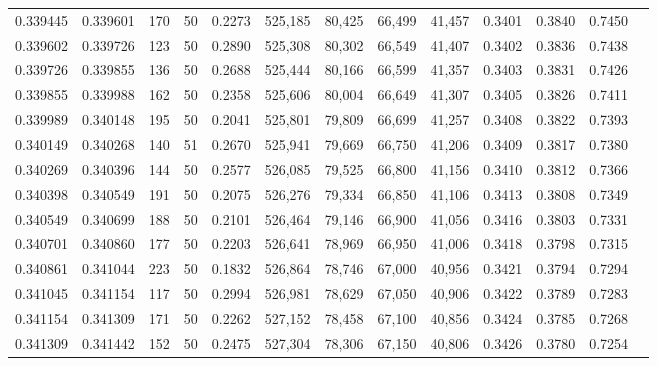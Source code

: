 \begin{tabular}{rrrrrrrrrrrrr}
0.339445 & 0.339601 &   170 &  50 &                                     0.2273 & 525,185 &  80,425 &  66,499 &  41,457 & 0.3401 & 0.3840 & 0.7450 \\
0.339602 & 0.339726 &   123 &  50 &                                     0.2890 & 525,308 &  80,302 &  66,549 &  41,407 & 0.3402 & 0.3836 & 0.7438 \\
0.339726 & 0.339855 &   136 &  50 &                                     0.2688 & 525,444 &  80,166 &  66,599 &  41,357 & 0.3403 & 0.3831 & 0.7426 \\
0.339855 & 0.339988 &   162 &  50 &                                     0.2358 & 525,606 &  80,004 &  66,649 &  41,307 & 0.3405 & 0.3826 & 0.7411 \\
0.339989 & 0.340148 &   195 &  50 &                                     0.2041 & 525,801 &  79,809 &  66,699 &  41,257 & 0.3408 & 0.3822 & 0.7393 \\
0.340149 & 0.340268 &   140 &  51 &                                     0.2670 & 525,941 &  79,669 &  66,750 &  41,206 & 0.3409 & 0.3817 & 0.7380 \\
0.340269 & 0.340396 &   144 &  50 &                                     0.2577 & 526,085 &  79,525 &  66,800 &  41,156 & 0.3410 & 0.3812 & 0.7366 \\
0.340398 & 0.340549 &   191 &  50 &                                     0.2075 & 526,276 &  79,334 &  66,850 &  41,106 & 0.3413 & 0.3808 & 0.7349 \\
0.340549 & 0.340699 &   188 &  50 &                                     0.2101 & 526,464 &  79,146 &  66,900 &  41,056 & 0.3416 & 0.3803 & 0.7331 \\
0.340701 & 0.340860 &   177 &  50 &                                     0.2203 & 526,641 &  78,969 &  66,950 &  41,006 & 0.3418 & 0.3798 & 0.7315 \\
0.340861 & 0.341044 &   223 &  50 &                                     0.1832 & 526,864 &  78,746 &  67,000 &  40,956 & 0.3421 & 0.3794 & 0.7294 \\
0.341045 & 0.341154 &   117 &  50 &                                     0.2994 & 526,981 &  78,629 &  67,050 &  40,906 & 0.3422 & 0.3789 & 0.7283 \\
0.341154 & 0.341309 &   171 &  50 &                                     0.2262 & 527,152 &  78,458 &  67,100 &  40,856 & 0.3424 & 0.3785 & 0.7268 \\
0.341309 & 0.341442 &   152 &  50 &                                     0.2475 & 527,304 &  78,306 &  67,150 &  40,806 & 0.3426 & 0.3780 & 0.7254 \\

\end{tabular}
